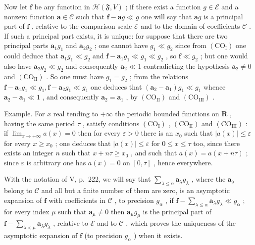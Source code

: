 Now let \(\mathbf{f}\) be any function in \(\mathcal{H}(\mathfrak{F}, V)\) ; if there exist a function \(g \in \mathcal{E}\) and a nonzero function \(\mathbf{a} \in \mathcal{C}\) such that \(\mathbf{f} - \mathbf{a}g \ll g\) one will say that \(\mathbf{a}g\) is a principal part of \(\mathbf{f}\) , relative to the comparison scale \(\mathcal{E}\) and to the domain of coefficients \(\mathcal{C}\) . If such a principal part exists, it is unique: for suppose that there are two principal parts \(\mathbf{a}_1g_1\) and \(\mathbf{a}_2g_2\) ; one cannot have \(g_1 \ll g_2\) since from \((\mathrm{CO_I})\) one could deduce that \(\mathbf{a}_1g_1 \ll g_2\) and \(\mathbf{f} - \mathbf{a}_1g_1 \ll g_1 \ll g_2\) , so \(\mathbf{f} \ll g_2\) ; but one would also have \(\mathbf{a}_2g_2 \ll g_2\) and consequently \(\mathbf{a}_2 \ll 1\) contradicting the hypothesis \(\mathbf{a}_2 \neq 0\) and \((\mathrm{CO_{II}})\) . So one must have \(g_1 = g_2\) ; from the relations \(\mathbf{f} - \mathbf{a}_1g_1 \ll g_1, \mathbf{f} - \mathbf{a}_2g_1 \ll g_1\) one deduces that \((\mathbf{a}_2 - \mathbf{a}_1)g_1 \ll g_1\) whence \(\mathbf{a}_2 - \mathbf{a}_1 \ll 1\) , and consequently \(\mathbf{a}_2 = \mathbf{a}_1\) , by \((\mathrm{CO_{II}})\) and \((\mathrm{CO_{III}})\) .

Example. For \(x\) real tending to \(+\infty\) the periodic bounded functions on \(\mathbf{R}\) , having the same period \(\tau\) , satisfy conditions \((\mathrm{CO}_{\mathrm{I}})\) , \((\mathrm{CO}_{\mathrm{II}})\) and \((\mathrm{CO}_{\mathrm{III}})\) : if \(\lim_{x\to +\infty}a(x) = 0\) then for every \(\varepsilon >0\) there is an \(x_0\) such that \(|a(x)|\leqslant \varepsilon\) for every \(x\geqslant x_0\) ; one deduces that \(|a(x)|\leqslant \varepsilon\) for \(0\leqslant x\leqslant \tau\) too, since there exists an integer \(n\) such that \(x + n\tau \geqslant x_0\) , and such that \(a(x) = a(x + n\tau)\) ; since \(\varepsilon\) is arbitrary one has \(a(x) = 0\) on \([0,\tau]\) , hence everywhere.

With the notation of V, p.~222, we will say that \(\sum_{\lambda \leqslant \alpha} \mathbf{a}_{\lambda} g_{\lambda}\) , where the \(\mathbf{a}_{\lambda}\) belong to \(\mathcal{C}\) and all but a finite number of them are zero, is an asymptotic expansion of \(\mathbf{f}\) with coefficients in \(\mathcal{C}\) , to precision \(g_{\alpha}\) , if \(\mathbf{f} - \sum_{\lambda \leqslant \alpha} \mathbf{a}_{\lambda} g_{\lambda} \ll g_{\alpha}\) ; for every index \(\mu\) such that \(\mathbf{a}_{\mu} \neq 0\) then \(\mathbf{a}_{\mu} g_{\mu}\) is the principal part of \(\mathbf{f} - \sum_{\lambda < \mu} \mathbf{a}_{\lambda} g_{\lambda}\) , relative to \(\mathcal{E}\) and to \(\mathcal{C}\) , which proves the uniqueness of the asymptotic expansion of \(\mathbf{f}\) (to precision \(g_{\alpha}\) ) when it exists.

